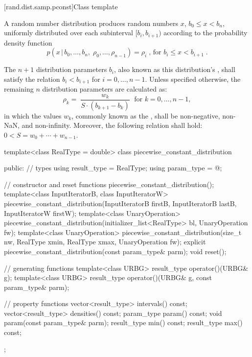 [rand.dist.samp.pconst]{Class template }%
%
%

\pnum
A  random number distribution
produces random numbers $x$,
$ b_0 \leq x < b_n $,
uniformly distributed over each subinterval
$ [ b_i, b_{i+1} ) $
according to the probability density function
%
%
\[%
 p(x\,|\,b_0,\ldots,b_n,\;\rho_0,\ldots,\rho_{n-1})
      = \rho_i
\; \mbox{,}
\mbox{ for } b_i \le x < b_{i+1}
\; \mbox{.}
\]

\pnum
The $n+1$ distribution parameters $b_i$,
also known as this distribution's %
%
%
, shall satisfy the relation
 $ b_i < b_{i+1} $
for $i = 0, \ldots, n\!-\!1 $.
Unless specified otherwise,
the remaining $n$ distribution parameters are calculated as:
\[%
 \rho_k = \;
   \frac{w_k}{S \cdot (b_{k+1}-b_k)}
   \; \mbox{ for } k = 0, \ldots, n\!-\!1,
\]
in which the values $w_k$,
commonly known as the %
%
%
, shall be non-negative, non-NaN, and non-infinity.
Moreover, the following relation shall hold:
 $ 0 < S = w_0 + \cdots + w_{n-1} $.

%
\begin{codeblock}
template<class RealType = double>
 class piecewise_constant_distribution
{
public:
 // types
 using result_type = RealType;
 using param_type  = @\unspec@;

 // constructor and reset functions
 piecewise_constant_distribution();
 template<class InputIteratorB, class InputIteratorW>
   piecewise_constant_distribution(InputIteratorB firstB, InputIteratorB lastB,
                                   InputIteratorW firstW);
 template<class UnaryOperation>
   piecewise_constant_distribution(initializer_list<RealType> bl, UnaryOperation fw);
 template<class UnaryOperation>
   piecewise_constant_distribution(size_t nw, RealType xmin, RealType xmax, UnaryOperation fw);
 explicit piecewise_constant_distribution(const param_type& parm);
 void reset();

 // generating functions
 template<class URBG>
   result_type operator()(URBG& g);
 template<class URBG>
   result_type operator()(URBG& g, const param_type& parm);

 // property functions
 vector<result_type> intervals() const;
 vector<result_type> densities() const;
 param_type param() const;
 void param(const param_type& parm);
 result_type min() const;
 result_type max() const;
};
\end{codeblock}


